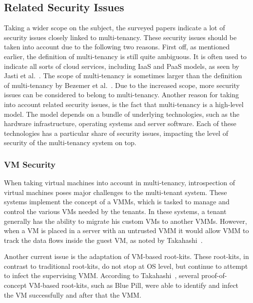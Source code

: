 \subsection{Related Security Issues}
Taking a wider scope on the subject, the surveyed papers indicate a lot of security issues closely linked to multi-tenancy. 
These security issues should be taken into account due to the following two reasons.
First off, as mentioned earlier, the definition of multi-tenancy is still quite ambiguous. 
It is often used to indicate all sorts of cloud services, including \ac{IaaS} and \ac{PaaS} models, as seen by Jasti et al.~\cite{Jasti2010Security}. 
The scope of multi-tenancy is sometimes larger than the definition of multi-tenancy by Bezemer et al.~\cite{bezemer2010multi}. Due to the increased scope, more security issues can be considered to belong to multi-tenancy.
Another reason for taking into account related security issues, is the fact that multi-tenancy is a high-level model. 
The model depends on a bundle of underlying technologies, such as the hardware infrastructure, operating systems and server software. 
Each of these technologies has a particular share of security issues, impacting the level of security of the multi-tenancy system on top. \\


\subsubsection{\acf{VM} Security}
When taking virtual machines into account in multi-tenancy, introspection of virtual machines poses major challenges to the multi-tenant system. 
These systems implement the concept of a \acp{VMM}, which is tasked to manage and control the various \acp{VM} needed by the tenants.
In these systems, a tenant generally has the ability to migrate his custom \acp{VM} to another \acp{VMM}. 
However, when a \ac{VM} is placed in a server with an untrusted \ac{VMM} it would allow \ac{VMM} to track the data flows inside the guest VM, as noted by Takahashi~\cite{Takahashi2012Security}.

Another current issue is the adaptation of VM-based root-kits. 
These root-kits, in contrast to traditional root-kits, do not stop at OS level, but continue to attempt to infect the supervising \ac{VMM}. 
According to Takahashi~\cite{Takahashi2012Security}, several proof-of-concept VM-based root-kits, such as Blue Pill, were able to identify and infect the VM successfully and after that the \ac{VMM}.

